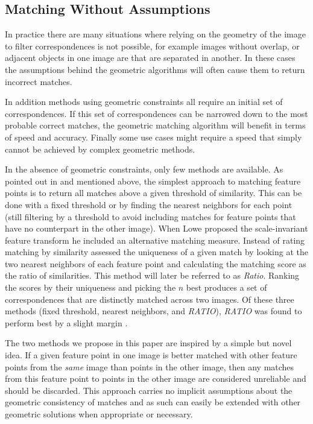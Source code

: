 \subsection{Matching Without Assumptions}

In practice there are many situations where relying on the geometry of 
the image to filter correspondences is not possible, for example images 
without overlap, or adjacent objects in one image are that are separated 
in another. In these cases the assumptions behind the geometric 
algorithms will often cause them to return incorrect matches.  

In addition methods using geometric constraints all require an initial 
set of correspondences. If this set of correspondences can be narrowed 
down to the most probable correct matches, the geometric matching 
algorithm will benefit in terms of speed and accuracy.  Finally some use 
cases might require a speed that simply cannot be achieved by complex 
geometric methods.

In the absence of geometric constraints, only few methods are available.  
As pointed out in \cite{szeliski2010} and mentioned above, the simplest 
approach to matching feature points is to return all matches above a 
given threshold of similarity.  This can be done with a fixed threshold 
or by finding the nearest neighbors for each point (still filtering by a 
threshold to avoid including matches for feature points that have no 
counterpart in the other image).  When Lowe \cite{lowe2004sift} proposed 
the scale-invariant feature transform he included an alternative 
matching measure. Instead of rating matching by similarity assessed the 
uniqueness of a given match by looking at the two nearest neighbors of 
each feature point and calculating the matching score as the ratio of 
similarities. This method will later be referred to as \emph{Ratio}.  
Ranking the scores by their uniqueness and picking the $n$ best produces 
a set of correspondences that are distinctly matched across two images.  
Of these three methods (fixed threshold, nearest neighbors, and 
\emph{RATIO}), \emph{RATIO} was found to perform best by a slight margin 
\cite{mikolajczyk2005performance}.

The two methods we propose in this paper are inspired by a simple but 
novel idea. If a given feature point in one image is better matched with 
other feature points from the \emph{same} image than points in the other 
image, then any matches from this feature point to points in the other 
image are considered unreliable and should be discarded.  This approach 
carries no implicit assumptions about the geometric consistency of 
matches and as such can easily be extended with other geometric 
solutions when appropriate or necessary.

